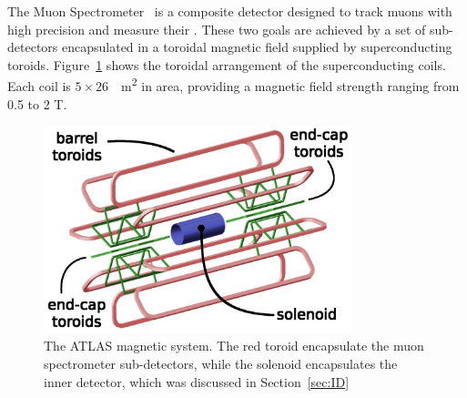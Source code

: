 \par The Muon Spectrometer~\cite{MUON-2010-01} is a composite detector designed to track  
muons with high precision and measure their \pT. These two goals are achieved by a set of 
sub-detectors encapsulated in a toroidal magnetic field supplied by superconducting 
toroids. Figure~\ref{fig:magnets} shows the toroidal arrangement of the superconducting coils.
Each coil is $5\times 26$~\SI{}{\m^2} in area, providing a magnetic field strength  
ranging from 0.5 to 2 T. 

\begin{figure}[!h]
	\centering
   \includegraphics[width=0.8\textwidth]{figures/magnetSystems.png}
	\caption{The ATLAS magnetic system. The red toroid encapsulate the muon spectrometer sub-detectors, 
while the solenoid encapsulates the inner detector, which was discussed in Section~\ref{sec:ID}}
	\label{fig:magnets}
\end{figure}

